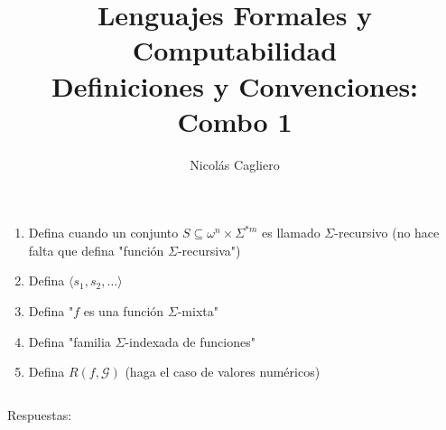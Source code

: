 \documentclass{article}
\title{Lenguajes Formales y Computabilidad \\
        \large Definiciones y Convenciones: Combo 1 }
\author{Nicolás Cagliero}
\begin{document}
\maketitle

\begin{enumerate}
    \item Defina cuando un conjunto $S \subseteq \omega^n \times \Sigma^{*m}$ 
    es llamado $\Sigma$-recursivo (no hace falta que defina "función $\Sigma$-recursiva")

    \item Defina $\langle s_1, s_2, \dots \rangle$
    
    \item Defina "$f$ es una función $\Sigma$-mixta"
    
    \item Defina "familia $\Sigma$-indexada de funciones"
    \item Defina $R(f, \mathcal{G})$ (haga el caso de valores numéricos)
\end{enumerate}
\(\)
\begin{center}
    Respuestas: 
    \(\)
\end{center}
\end{document}
